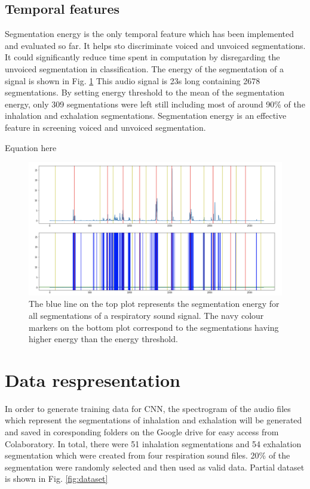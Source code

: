 \subsection{Temporal features}
Segmentation energy is the only temporal feature which has been implemented and evaluated so far. It helps sto discriminate voiced and unvoiced segmentations. It could significantly reduce time spent in computation by disregarding the unvoiced segmentation in classification. The energy of the segmentation of a signal is shown in Fig. \ref{fig:energy} This audio signal is 23s long containing 2678 segmentations. By setting energy threshold to the mean of the segmentation energy, only 309 segmentations were left still including most of around 90\% of the inhalation and exhalation segmentations. 
Segmentation energy is an effective feature in screening voiced and unvoiced segmentation. 

Equation here

\begin{figure}[h]
    \centerline{\includegraphics[scale=0.35]{figures/energy.png}}
    \caption{The blue line on the top plot represents the segmentation energy for all segmentations of a respiratory sound signal. The navy colour markers on the bottom plot correspond to the segmentations having higher energy than the energy threshold.}
    \label{fig:energy}
\end{figure}

\section{Data respresentation}
In order to generate training data for CNN, the spectrogram of the audio files which represent the segmentations of inhalation and exhalation will be generated and saved in coresponding folders on the Google drive for easy access from Colaboratory. In total, there were 51 inhalation segmentations and 54 exhalation segmentation which were created from four respiration sound files. 20\% of the segmentation were randomly selected and then used as valid data. Partial dataset is shown in Fig. \ref{fig:dataset}

